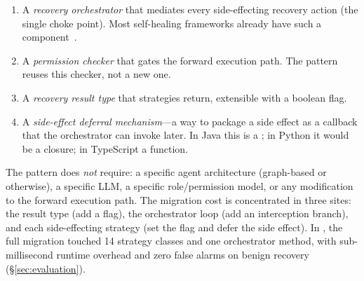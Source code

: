 \begin{enumerate}[leftmargin=*]
    \item A \emph{recovery orchestrator} that mediates every side-effecting recovery action (the single choke point). Most self-healing frameworks already have such a component~\cite{autogen,langgraph,reflexion}.
    \item A \emph{permission checker} that gates the forward execution path. The pattern reuses this checker, not a new one.
    \item A \emph{recovery result type} that strategies return, extensible with a boolean flag.
    \item A \emph{side-effect deferral mechanism}---a way to package a side effect as a callback that the orchestrator can invoke later. In Java this is a ; in Python it would be a closure; in TypeScript a  function.
\end{enumerate}

The pattern does \emph{not} require: a specific agent architecture (graph-based or otherwise), a specific LLM, a specific role/permission model, or any modification to the forward execution path. The migration cost is concentrated in three sites: the result type (add a flag), the orchestrator loop (add an interception branch), and each side-effecting strategy (set the flag and defer the side effect). In \system{}, the full migration touched 14 strategy classes and one orchestrator method, with sub-millisecond runtime overhead and zero false alarms on benign recovery (\S\ref{sec:evaluation}).
